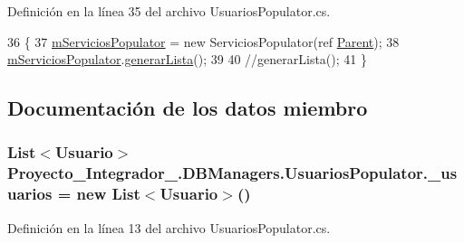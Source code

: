 Definición en la línea 35 del archivo Usuarios\-Populator.\-cs.


\begin{DoxyCode}
36             \{
37                 \hyperlink{class_proyecto___integrador__3_1_1_d_b_managers_1_1_usuarios_populator_a38322db59dd24df528d67958f931921e}{mServiciosPopulator} = \textcolor{keyword}{new} ServiciosPopulator(ref 
      \hyperlink{class_proyecto___integrador__3_1_1_d_b_managers_1_1_usuarios_populator_a262c4a0f4d44e86a9030208d6cb6d26a}{Parent});
38                 \hyperlink{class_proyecto___integrador__3_1_1_d_b_managers_1_1_usuarios_populator_a38322db59dd24df528d67958f931921e}{mServiciosPopulator}.\hyperlink{class_proyecto___integrador__3_1_1_d_b_managers_1_1_servicios_populator_a9ac6be7f5ecdbdadd850b3519a985f75}{generarLista}();
39 
40                 \textcolor{comment}{//generarLista();}
41             \}
\end{DoxyCode}


\subsection{Documentación de los datos miembro}
\hypertarget{class_proyecto___integrador__3_1_1_d_b_managers_1_1_usuarios_populator_a4e30b143aa6f019cf45324d6192ea802}{
\subsubsection[{\-\_\-usuarios}]{\setlength{\rightskip}{0pt plus 5cm}List$<${\bf Usuario}$>$ Proyecto\-\_\-\-Integrador\-\_.\-D\-B\-Managers.\-Usuarios\-Populator.\-\_\-usuarios = new List$<${\bf Usuario}$>$()\hspace{0.3cm}{\ttfamily [private]}}}\label{class_proyecto___integrador__3_1_1_d_b_managers_1_1_usuarios_populator_a4e30b143aa6f019cf45324d6192ea802}


Definición en la línea 13 del archivo Usuarios\-Populator.\-cs.

